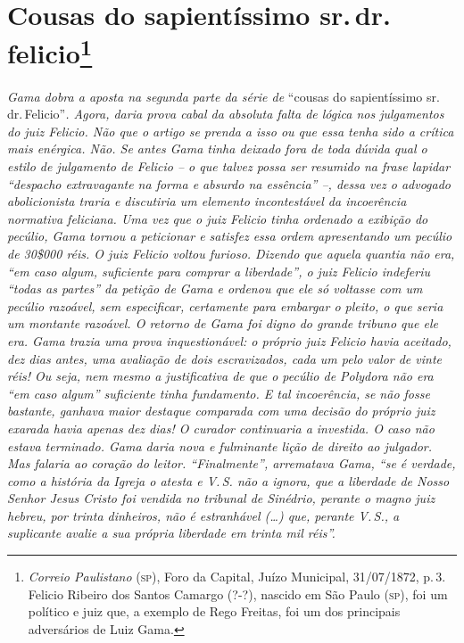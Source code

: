 \chapter{Cousas do sapientíssimo sr.\,dr.\,felicio\footnote{\emph{Correio Paulistano} (\textsc{sp}), Foro da Capital, Juízo
  Municipal, 31/07/1872, p.\,3. Felicio Ribeiro dos Santos Camargo (?-?),
  nascido em São Paulo (\textsc{sp}), foi um político e juiz que, a exemplo de
  Rego Freitas, foi um dos principais adversários de Luiz Gama.}} %

\begin{didascalia}
\emph{Gama dobra a aposta na segunda parte da série de} ``cousas do
sapientíssimo sr.\,dr.\,Felicio''\emph{. Agora, daria prova cabal da
absoluta falta de lógica nos julgamentos do juiz Felicio. Não que o
artigo se prenda a isso ou que essa tenha sido a crítica mais enérgica.
Não. Se antes Gama tinha deixado fora de toda dúvida qual o estilo de
julgamento de Felicio -- o que talvez possa ser resumido na frase
lapidar ``despacho extravagante na forma e absurdo na essência'' --, dessa
vez o advogado abolicionista traria e discutiria um elemento
incontestável da incoerência normativa feliciana. Uma vez que o juiz
Felicio tinha ordenado a exibição do pecúlio, Gama tornou a peticionar e
satisfez essa ordem apresentando um pecúlio de 30\$000 réis. O juiz
Felicio voltou furioso. Dizendo que aquela quantia não era, ``em caso
algum, suficiente para comprar a liberdade'', o juiz Felicio indeferiu
``todas as partes'' da petição de Gama e ordenou que ele só voltasse com
um pecúlio razoável, sem especificar, certamente para embargar o pleito,
o que seria um montante razoável. O retorno de Gama foi digno do grande
tribuno que ele era. Gama trazia uma prova inquestionável: o próprio
juiz Felicio havia aceitado, dez dias antes, uma avaliação de dois
escravizados, cada um pelo valor de vinte réis! Ou seja, nem mesmo a
justificativa de que o pecúlio de Polydora não era ``em caso algum''
suficiente tinha fundamento. E tal incoerência, se não fosse bastante,
ganhava maior destaque comparada com uma decisão do próprio juiz exarada
havia apenas dez dias! O curador continuaria a investida. O caso não
estava terminado. Gama daria nova e fulminante lição de direito ao
julgador. Mas falaria ao coração do leitor. ``Finalmente'', arrematava
Gama, ``se é verdade, como a história da Igreja o atesta e V.\,S. não a
ignora, que a liberdade de Nosso Senhor Jesus Cristo foi vendida no
tribunal de Sinédrio, perante o magno juiz hebreu, por trinta dinheiros,
não é estranhável (\ldots{}) que, perante V.\,S., a suplicante avalie a sua
própria liberdade em trinta mil réis''.}
\end{didascalia}


